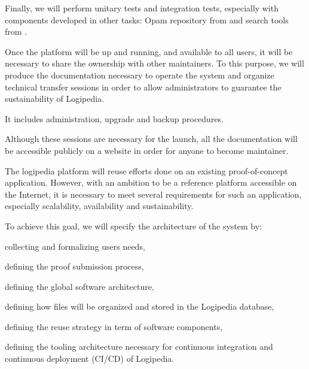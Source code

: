 \begin{workpackage}[id=access,type=RTD,wphases=1-48,
  short=Access,%
  title={Access},
  lead=Inr,InrRM=48,OcaRM=6,EduRM=12]
\begin{tasklist}
{\begin{task}[id=web,
      title=Giving access to the infrastructure on the world-wide web,
      shorttitle=Web access,
      lead=Inr,InrRM=18,,wphases=8-27]
    Finally, we will perform unitary tests and integration tests,
    especially with components developed in other tasks: Opam
    repository from  and search tools from
    .
  \end{task}

  \begin{task}[id=transfer,
      title=Transfer for the sustainability of the system,
      shorttitle=Transfer,
      lead=Inr,InrRM=1,wphases=28-29]
    Once the platform will be up and running, and available to all
    users, it will be necessary to share the ownership with other
    maintainers. To this purpose, we will produce the documentation
    necessary to operate the system and organize technical transfer
    sessions in order to allow administrators to guarantee the
    sustainability of Logipedia.

    It includes administration, upgrade and backup procedures.

    Although these sessions are necessary for the launch, all the
    documentation will be accessible publicly on a website in order
    for anyone to become maintainer.
  \end{task}
  }

  \begin{task}[id=archi,
      title=Setting up the hardware and software architecture,
      shorttitle=Arch.,
      lead=Inr,InrRM=6,wphases=1-6]
    The logipedia platform will reuse efforts done on an existing
    proof-of-concept application. However, with an ambition to be a
    reference platform accessible on the Internet, it is necessary to meet
    several requirements for such an application, especially
    scalability, availability and sustainability.

    To achieve this goal, we will specify the architecture of the system by:
    \begin{compactitem}
    \item collecting and formalizing users needs,
    \item defining the proof submission process,
    \item defining the global software architecture,
    \item defining how files will be organized and stored in the
      Logipedia database,
    \item defining the reuse strategy in term of software components,
    \item defining the tooling architecture necessary for continuous
      integration and continuous deployment (CI/CD) of Logipedia.
    \end{compactitem}


\end{task}
\end{tasklist}
\end{workpackage}
